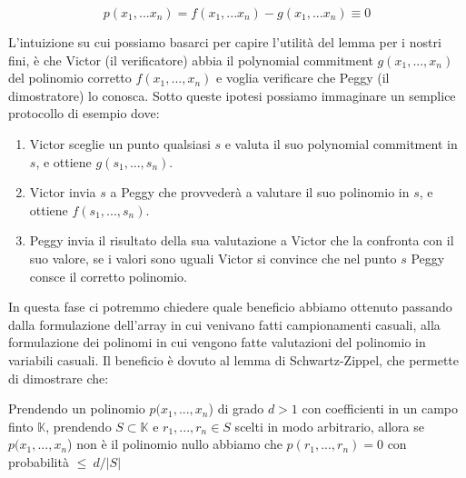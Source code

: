 \begin{equation}
p(x_1,...x_n) = f(x_1,...x_n)-g(x_1,...x_n) \equiv 0
\end{equation}

L'intuizione su cui possiamo basarci per capire l’utilità del lemma per i nostri fini, è che Victor (il verificatore) abbia il polynomial
commitment  $g(x_1,...,x_n)$ del polinomio corretto $f(x_1,...,x_n)$ e voglia verificare che Peggy (il dimostratore) lo
conosca. \clearpage
Sotto queste ipotesi possiamo immaginare un semplice protocollo di esempio dove:
\begin{enumerate}
    \item  Victor sceglie un punto qualsiasi $s$ e valuta il suo polynomial commitment in $s$, e ottiene $g(s_1,...,s_n)$.
    \item  Victor invia $s$ a Peggy che provvederà a valutare il suo polinomio in $s$, e ottiene $f(s_1,...,s_n)$.
    \item  Peggy invia il risultato della sua valutazione a Victor che la confronta con il suo valore, se i
    valori sono uguali Victor si convince che nel punto $s$ Peggy consce il corretto polinomio.
\end{enumerate}

In questa fase ci potremmo chiedere quale beneficio abbiamo ottenuto passando dalla formulazione dell'array in cui
venivano fatti campionamenti casuali, alla formulazione dei polinomi in cui vengono fatte valutazioni del polinomio in
variabili casuali. Il beneficio è dovuto al lemma di Schwartz-Zippel, che permette di dimostrare che:

Prendendo un polinomio $p(x_1,...,x_n$) di grado $d > 1$ con coefficienti in un campo finto $\mathbb{K}$, prendendo 
$S \subset \mathbb{K}$ e $r_1,...,r_n \in S$ scelti in modo arbitrario, allora se $p(x_1,...,x_n$) non è il polinomio nullo
abbiamo che $p(r_1,...,r_n) = 0$ con probabilità $\le \ d/|S|$

